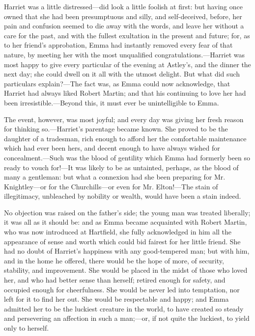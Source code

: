 Harriet was a little distressed---did look a little foolish at first: but having once owned that she had been presumptuous and silly, and self-deceived, before, her pain and confusion seemed to die away with the words, and leave her without a care for the past, and with the fullest exultation in the present and future; for, as to her friend's approbation, Emma had instantly removed every fear of that nature, by meeting her with the most unqualified congratulations.---Harriet was most happy to give every particular of the evening at Astley's, and the dinner the next day; she could dwell on it all with the utmost delight. But what did such particulars explain?---The fact was, as Emma could now acknowledge, that Harriet had always liked Robert Martin; and that his continuing to love her had been irresistible.---Beyond this, it must ever be unintelligible to Emma.

The event, however, was most joyful; and every day was giving her fresh reason for thinking so.---Harriet's parentage became known. She proved to be the daughter of a tradesman, rich enough to afford her the comfortable maintenance which had ever been hers, and decent enough to have always wished for concealment.---Such was the blood of gentility which Emma had formerly been so ready to vouch for!---It was likely to be as untainted, perhaps, as the blood of many a gentleman: but what a connexion had she been preparing for Mr. Knightley---or for the Churchills---or even for Mr. Elton!---The stain of illegitimacy, unbleached by nobility or wealth, would have been a stain indeed.

No objection was raised on the father's side; the young man was treated liberally; it was all as it should be: and as Emma became acquainted with Robert Martin, who was now introduced at Hartfield, she fully acknowledged in him all the appearance of sense and worth which could bid fairest for her little friend. She had no doubt of Harriet's happiness with any good-tempered man; but with him, and in the home he offered, there would be the hope of more, of security, stability, and improvement. She would be placed in the midst of those who loved her, and who had better sense than herself; retired enough for safety, and occupied enough for cheerfulness. She would be never led into temptation, nor left for it to find her out. She would be respectable and happy; and Emma admitted her to be the luckiest creature in the world, to have created so steady and persevering an affection in such a man;---or, if not quite the luckiest, to yield only to herself.

